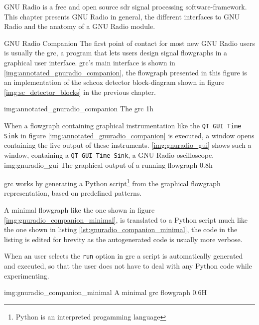 GNU Radio \cite{gnuradioweb} is a free \cite{fsffreeweb} and open source
\acrshort{sdr} signal processing software-framework.
This chapter presents GNU Radio in general, the different interfaces
to GNU Radio and the anatomy of a GNU Radio module.

\begin{subchapter}{GNU Radio Companion}
  The first point of contact for most new GNU Radio users
  is usually the \gls{grc}, a program that lets
  users design signal flowgraphs in a graphical user interface.
  \Gls{grc}'s main interface is shown in
  \autoref{img:annotated_gnuradio_companion}, the flowgraph presented
  in this figure is an implementation of the
  \acrlong{schcox} detector block-diagram
  shown in figure \ref{img:sc_detector_blocks} in the previous
  chapter.

               {img:annotated_gnuradio_companion}
               {The \acrlong{grc}}
               {1}{h}

  When a flowgraph containing graphical instrumentation like
  the \texttt{QT GUI Time Sink} in figure \ref{img:annotated_gnuradio_companion}
  is executed, a window opens containing the live output of
  these instruments.
  \autoref{img:gnuradio_gui} shows such a window, containing
  a \texttt{QT GUI Time Sink}, a GNU Radio oscilloscope. \\

                  {img:gnuradio_gui}
                  {The graphical output of a running flowgraph}
                  {0.8}{h}

  \Gls{grc} works by generating a
  Python script\footnote{Python is an interpreted progamming language}
  from the
  graphical flowgraph representation, based on predefined
  patterns.

  A minimal flowgraph like the one shown in figure
  \ref{img:gnuradio_companion_minimal}, is translated
  to a Python script
  much like the one shown in
  listing \ref{lst:gnuradio_companion_minimal},
  the code in the listing is edited for brevity
  as the autogenerated code is usually more verbose.

  When an user selects the \texttt{run} option in \gls{grc}
  a script is automatically generated and executed,
  so that the user does not have to deal with any Python
  code while experimenting.

                  {img:gnuradio_companion_minimal}
                  {A minimal \gls{grc} flowgraph}
                  {0.6}{H}
\end{subchapter}


